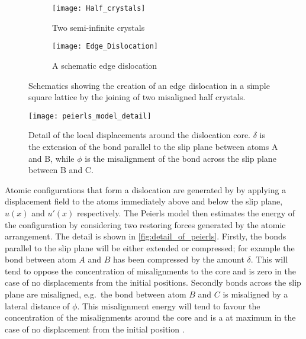 \begin{figure}
\centering

    \begin{subfigure}{0.4\textwidth}
        \texttt{[image: Half\_crystals]}
        \caption{Two semi-infinite crystals \label{fig:semi_infinite_crystals}}
    \end{subfigure}
    
    \vspace{0.5cm}
    
    \begin{subfigure}{0.4\textwidth}
        \texttt{[image: Edge\_Dislocation]}
        \caption{A schematic edge dislocation\label{fig:joined_half_crystals}}
    \end{subfigure}

    \captionsetup{width=0.5\textwidth}
    \caption[Building an edge dislocation.]{Schematics showing the creation of an edge dislocation in a simple square lattice by the joining of two misaligned half crystals. \label{fig:edge_disloc}}
\end{figure}

\begin{figure}
\centering
\texttt{[image: peierls\_model\_detail]}
\captionsetup{width=0.7\textwidth}
\caption[Local displacements around an edge dislocation.]{Detail of the local displacements around the dislocation core. $\delta$ is the extension of the bond parallel to the slip plane between atoms A and B, while $\phi$ is the misalignment of the bond across the slip plane between B and C.\label{fig:detail_of_peierls}}
\end{figure}

Atomic configurations that form a dislocation are generated by by applying a displacement field to the atoms immediately above and below the slip plane, $u(x)$ and $u'(x)$ respectively. The Peierls model then estimates the energy of the configuration by considering two restoring forces generated by the atomic arrangement. The detail is shown in \autoref{fig:detail_of_peierls}. Firstly, the bonds parallel to the slip plane will be either extended or compressed; for example the bond between atom $A$ and $B$ has been compressed by the amount $\delta$. This will tend to oppose the concentration of misalignments to the core and is zero in the case of no displacements from the initial positions. Secondly bonds across the slip plane are misaligned, e.g.\ the bond between atom $B$ and $C$ is misaligned by a lateral distance of $\phi$. This misalignment energy will tend to favour the concentration of the misalignments around the core and is a at maximum in the case of no displacement from the initial position \cite{Cottrell1953}.

